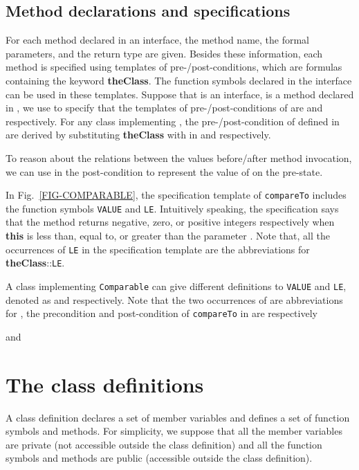 \documentclass[fleqn]{llncs}
\begin{document}
\subsection{Method declarations and specifications}
For each method declared in an interface, the method name, the formal parameters, and the return type
are given. Besides these information, each method is specified using templates of pre-/post-conditions, which are formulas containing the keyword
\textbf{theClass}.
The function symbols declared in the interface can be used in these templates.
Suppose that  is an interface,  is a method declared in ,
we use  to specify that the templates of pre-/post-conditions of  are  and  respectively.
For any class  implementing , the pre-/post-condition of  defined in  are derived by substituting \textbf{theClass} with  in
 and  respectively.

To reason about the relations between the values before/after method invocation, we can use  in the post-condition
to represent the value of  on the pre-state.

\begin{example}
In Fig.~\ref{FIG-COMPARABLE}, the specification template of  \texttt{compareTo} includes the function symbols \texttt{VALUE} and \texttt{LE}.
Intuitively speaking, the specification says that the method returns negative, zero, or positive integers respectively
when \textbf{this} is less than, equal to, or greater than the parameter .
Note that, all the occurrences  of \texttt{LE} in the specification template are the abbreviations for \textbf{theClass}::\texttt{LE}.

A class  implementing \texttt{Comparable} can give different definitions to \texttt{VALUE} and \texttt{LE}, denoted as 
and  respectively. Note that the two occurrences of  are abbreviations for ,
the precondition and post-condition of \texttt{compareTo} in  are respectively

and

\hfill
\end{example}

\section{The class definitions}\label{SEC-CLASS}
A class definition declares a set of member variables and defines a set of function symbols and methods. For simplicity,
we suppose that all the member variables are private (not accessible outside the class definition) and all the function symbols and methods are public (accessible outside the class definition).
\end{document}

